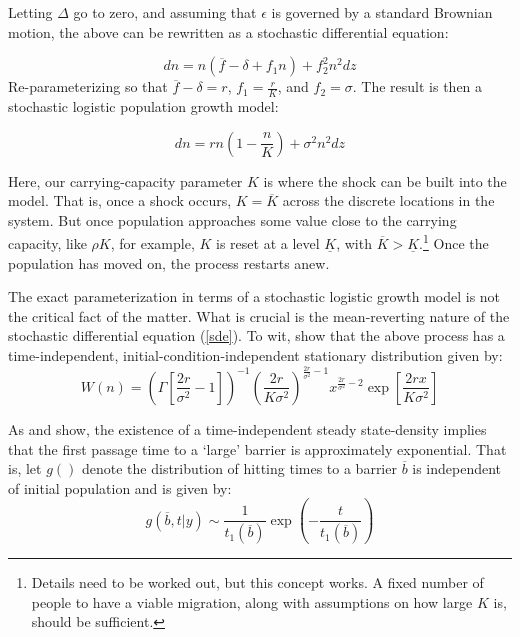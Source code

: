 \documentclass[11pt]{article}
\begin{document}
Letting $\Delta $ go to zero, and assuming that $\epsilon$ is governed by a standard Brownian motion, the above can be rewritten as a stochastic differential equation:

\begin{equation*}
dn=n(\overline{f}-\delta+f_1n)+f_2^2n^2dz
\end{equation*}
Re-parameterizing so that  $\overline{f}-\delta =r$, $f_1=\frac{r}{K}$, and $f_2=\sigma$. The result is then a stochastic logistic population growth model:

\begin{equation}
dn=rn\left(1-\frac{n}{K}\right)+\sigma^2n^2dz
\end{equation} \label{sde}

Here, our carrying-capacity parameter $K$ is where the shock can be built into the model. That is, once a shock occurs, $K=\overline{K}$ across the discrete locations in the system. But once population approaches some value close to the carrying capacity, like $\rho K$, for example, $K$ is reset at a level $\underline{K}$, with $\overline{K}>\underline{K}$.\footnote{Details need to be worked out, but this concept works. A fixed number of people to have a viable migration, along with assumptions on how large $K$ is, should be sufficient.} Once the population has moved on, the process restarts anew.

The exact parameterization in terms of a stochastic logistic growth model is not the critical fact of the matter. What is crucial is the mean-reverting nature of the stochastic differential equation (\ref{sde}). To wit, \cite{rdgn99} show that the above process has a time-independent, initial-condition-independent stationary distribution given by:
\begin{equation*}
W(n) = \left( \Gamma\left[\frac{2r}{\sigma^2}-1\right]\right)^{-1}\left(\frac{2r}{K\sigma^2}\right)^{\frac{2r}{\sigma^2}-1}x^{\frac{2r}{\sigma^2}-2}\exp\left[\frac{2rx}{K\sigma^2}\right]
\end{equation*}

As \cite{rdgn99} and \cite{nrs85} show, the existence of a time-independent steady state-density implies that the first passage time to a `large' barrier is approximately exponential. That is, let $g()$ denote the distribution of hitting times to a barrier $\overline{b}$ is independent of initial population and is given by:
\begin{equation*}
g(\overline{b},t|y) \sim \frac{1}{t_1(\overline{b})}\exp\left(-\frac{t}{t_1(\overline{b})}\right) 
\end{equation*}
\end{document}
